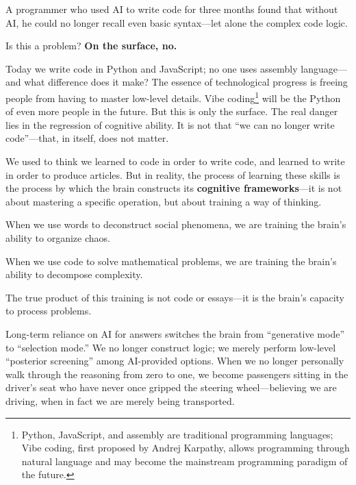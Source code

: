 A programmer who used AI to write code for three months found that without AI, he could no longer recall even basic syntax---let alone the complex code logic.

\vspace{1em}

Is this a problem? \textbf{On the surface, no.}

Today we write code in Python and JavaScript; no one uses assembly language---and what difference does it make? The essence of technological progress is freeing people from having to master low-level details.
Vibe coding\footnote{Python, JavaScript, and assembly are traditional programming languages; Vibe coding, first proposed by Andrej Karpathy, allows programming through natural language and may become the mainstream programming paradigm of the future.} will be the Python of even more people in the future.
But this is only the surface. The real danger lies in the regression of cognitive ability.
It is not that ``we can no longer write code''---that, in itself, does not matter.

\vspace{1em}

We used to think we learned to code in order to write code, and learned to write in order to produce articles. But in reality, the process of learning these skills is the process by which the brain constructs its \textbf{cognitive frameworks}---it is not about mastering a specific operation, but about training a way of thinking.

\vspace{1em}

When we use words to deconstruct social phenomena, we are training the brain's ability to organize chaos.

When we use code to solve mathematical problems, we are training the brain's ability to decompose complexity.

The true product of this training is not code or essays---it is the brain's capacity to process problems.

\vspace{1em}

Long-term reliance on AI for answers switches the brain from ``generative mode'' to ``selection mode.'' We no longer construct logic; we merely perform low-level ``posterior screening'' among AI-provided options. When we no longer personally walk through the reasoning from zero to one, we become passengers sitting in the driver's seat who have never once gripped the steering wheel---believing we are driving, when in fact we are merely being transported.


